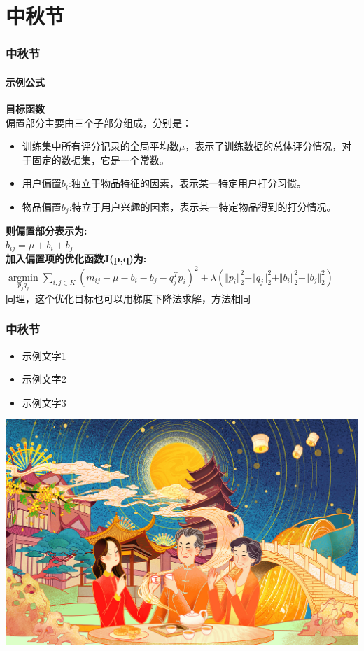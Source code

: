 \documentclass{beamer}
\begin{document}
\section{中秋节}
	\begin{frame}
	\frametitle{中秋节}
	\framesubtitle{示例公式}
		\textbf{目标函数}\\
		偏置部分主要由三个子部分组成，分别是：
		\begin{minipage}[c][0.35\textheight][c]{\linewidth}
			\centering
			\begin{itemize}
  				\item 训练集中所有评分记录的全局平均数$\mu$，表示了训练数据的总体评分情况，对于固定的数据集，它是一个常数。
  				\item 用户偏置$b_i$:独立于物品特征的因素，表示某一特定用户打分习惯。
  				\item 物品偏置$b_j$:特立于用户兴趣的因素，表示某一特定物品得到的打分情况。	
  			\end{itemize}
		\end{minipage}
		\begin{minipage}[c][0.15\textheight][c]{\linewidth}
			\centering
			\textbf{则偏置部分表示为:}\\
			$b_{ij}=\mu+b_i+b_j$\\
			\textbf{加入偏置项的优化函数J(p,q)为:}\\
			$\mathop{\arg\min}\limits_{p_j q_j}\sum_{i,j\in K}(m_{ij}-\mu-b_i-b_j-q_j^Tp_i)^2+\lambda(\Vert p_i \Vert_2^2+\Vert q_j \Vert_2^2+\Vert b_i \Vert_2^2+\Vert b_j \Vert_2^2)$\\
			同理，这个优化目标也可以用梯度下降法求解，方法相同
		\end{minipage}
	\end{frame}
	\begin{frame}
	\frametitle{中秋节}
		\begin{minipage}[c][0.4\textheight][c]{\linewidth}
			\centering
			\begin{itemize}
  				\item 示例文字1
  				\item 示例文字2
  				\item 示例文字3
			\end{itemize}
		\end{minipage}
		\begin{minipage}[c][0.4\textheight][c]{\linewidth}
			\centering
			\includegraphics[width=0.5\linewidth]{fig/zq}
		\end{minipage}
	\end{frame}
	
\end{document}
